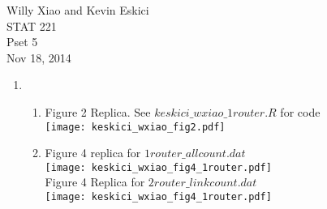 \documentclass[paper=a4, fontsize=11pt]{scrartcl}
\begin{document}
\noindent Willy Xiao and Kevin Eskici \\ STAT 221 \\Pset 5\\ Nov 18, 2014
\begin{enumerate}
  \item
    \begin{enumerate}[1]
      \item Figure 2 Replica. See $keskici\_wxiao\_1router.R$ for code \\
      \texttt{[image: keskici\_wxiao\_fig2.pdf]}
      \item Figure 4 replica for $1router\_allcount.dat$ \\
      \texttt{[image: keskici\_wxiao\_fig4\_1router.pdf]}\\
      Figure 4 Replica for $2router\_linkcount.dat$ \\
      \texttt{[image: keskici\_wxiao\_fig4\_1router.pdf]}


\end{enumerate}
\end{enumerate}
\end{document}
